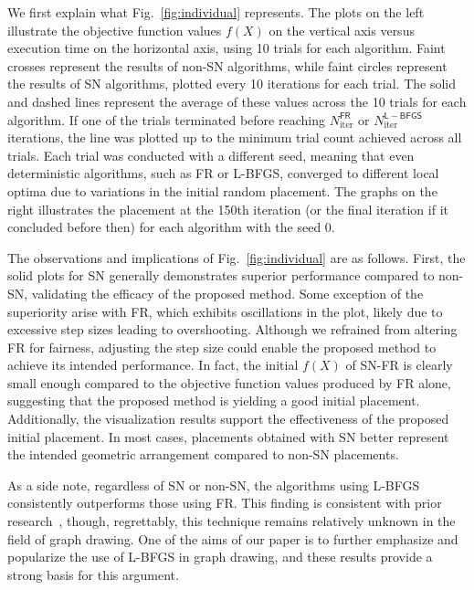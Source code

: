 \documentclass[dvipdfmx,journal]{IEEEtran}
\begin{document}
We first explain what Fig.~\ref{fig:individual} represents.
The plots on the left illustrate the objective function values $f(X)$ on the vertical axis versus execution time on the horizontal axis, using 10 trials for each algorithm.
Faint crosses represent the results of non-\textsf{SN} algorithms, while faint circles represent the results of \textsf{SN} algorithms, plotted every 10 iterations for each trial.
The solid and dashed lines represent the average of these values across the 10 trials for each algorithm.
If one of the trials terminated before reaching $N_\mathrm{iter}^\mathsf{FR}$ or $N_\mathrm{iter}^\mathsf{L-BFGS}$ iterations, the line was plotted up to the minimum trial count achieved across all trials.
Each trial was conducted with a different seed, meaning that even deterministic algorithms, such as
\textsf{FR} or \textsf{L-BFGS}, converged to different local optima due to variations in the initial random placement.
The graphs on the right illustrates the placement at the 150th iteration (or the final iteration if it concluded before then) for each algorithm with the seed 0.

The observations and implications of Fig.~\ref{fig:individual} are as follows.
First, the solid plots for \textsf{SN} generally demonstrates superior performance compared to non-\textsf{SN}, validating the efficacy of the proposed method.
Some exception of the superiority arise with \textsf{FR}, which exhibits oscillations in the plot, likely due to excessive step sizes leading to overshooting.
Although we refrained from altering \textsf{FR} for fairness, adjusting the step size could enable the proposed method to achieve its intended performance.
In fact, the initial $f(X)$ of \textsf{SN-FR} is clearly small enough compared to the objective function values produced by \textsf{FR} alone, suggesting that the proposed method is yielding a good initial placement.
Additionally, the visualization results support the effectiveness of the proposed initial placement. In most cases, placements obtained with \textsf{SN} better represent the intended geometric arrangement compared to non-\textsf{SN} placements.

As a side note, regardless of \textsf{SN} or non-\textsf{SN}, the algorithms using \textsf{L-BFGS} consistently outperforms those using \textsf{FR}.
This finding is consistent with prior research~\cite{6183577}, though, regrettably, this technique remains relatively unknown in the field of graph drawing.
One of the aims of our paper is to further emphasize and popularize the use of \textsf{L-BFGS} in graph drawing, and these results provide a strong basis for this argument.
\end{document}
